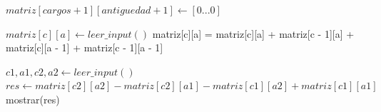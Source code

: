 \begin{algorithmic}

	\State $matriz[cargos + 1][antiguedad + 1] \gets [0...0]$ 

			\State $matriz[c][a] \gets leer\_input()$
			\State matriz[c][a] = matriz[c][a] + matriz[c - 1][a] + matriz[c][a - 1] + matriz[c - 1][a - 1]
		\EndFor
	\EndFor

		\State $c1, a1, c2, a2 \gets leer\_input()$
		\State $res \gets matriz[c2][a2] - matriz[c2][a1] - matriz[c1][a2] + matriz[c1][a1]$
		\State mostrar(res)
	\EndFor

\end{algorithmic}
